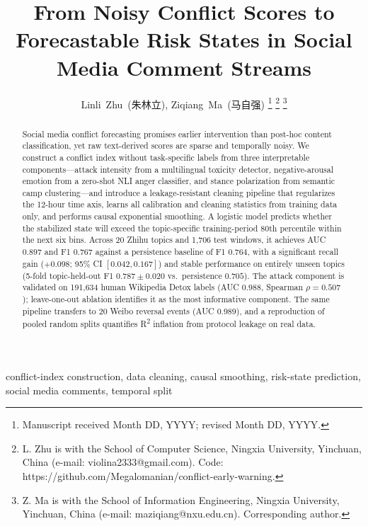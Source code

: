 \documentclass[journal]{IEEEtran}
\begin{document}
\title{From Noisy Conflict Scores to Forecastable Risk States in Social Media Comment Streams}

\author{Linli~Zhu\ (朱林立), Ziqiang~Ma\ (马自强)%
\thanks{Manuscript received Month DD, YYYY; revised Month DD, YYYY.}%
\thanks{L. Zhu is with the School of Computer Science, Ningxia University, Yinchuan, China (e-mail: violina2333@gmail.com). Code: https://github.com/Megalomanian/conflict-early-warning.}%
\thanks{Z. Ma is with the School of Information Engineering, Ningxia University, Yinchuan, China (e-mail: maziqiang@nxu.edu.cn). Corresponding author.}}

\maketitle

\begin{abstract}
Social media conflict forecasting promises earlier intervention than post-hoc content classification, yet raw text-derived scores are sparse and temporally noisy. We construct a conflict index without task-specific labels from three interpretable components---attack intensity from a multilingual toxicity detector, negative-arousal emotion from a zero-shot NLI anger classifier, and stance polarization from semantic camp clustering---and introduce a leakage-resistant cleaning pipeline that regularizes the 12-hour time axis, learns all calibration and cleaning statistics from training data only, and performs causal exponential smoothing. A logistic model predicts whether the stabilized state will exceed the topic-specific training-period 80th percentile within the next six bins. Across 20 Zhihu topics and 1,706 test windows, it achieves AUC $0.897$ and F1 $0.767$ against a persistence baseline of F1 $0.764$, with a significant recall gain ($+0.098$; 95\% CI $[0.042,0.167]$) and stable performance on entirely unseen topics (5-fold topic-held-out F1 $0.787\pm0.020$ vs.\ persistence $0.705$). The attack component is validated on 191,634 human Wikipedia Detox labels (AUC $0.988$, Spearman $\rho=0.507$); leave-one-out ablation identifies it as the most informative component. The same pipeline transfers to 20 Weibo reversal events (AUC $0.989$), and a reproduction of pooled random splits quantifies R\textsuperscript{2} inflation from protocol leakage on real data.
\end{abstract}

\begin{IEEEkeywords}
conflict-index construction, data cleaning, causal smoothing, risk-state prediction, social media comments, temporal split
\end{IEEEkeywords}
\end{document}
